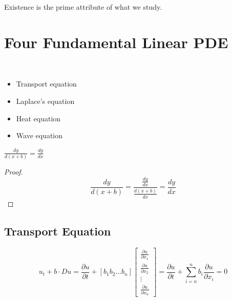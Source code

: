 \documentclass{article}
\begin{document}
\begin{remark}
    Existence is the prime attribute of what we study.
\end{remark}

\section{Four Fundamental Linear PDE}
\begin{definition}~
    \begin{itemize}
        \item Transport equation
        \item Laplace's equation
        \item Heat equation
        \item Wave equation
    \end{itemize}
\end{definition}

\begin{lemma}
    $\frac{dy}{d(x+b)} = \frac{dy}{dx}$
\end{lemma}

\begin{proof}
    \begin{equation*}
        \frac{dy}{d(x+b)} = \frac{\frac{dy}{dx}}{\frac{d(x+b)}{dx}} = \frac{dy}{dx}
    \end{equation*}
\end{proof}

\subsection{Transport Equation}
\begin{definition}
    \begin{equation}
        \label{equ:transport-equation}
        u_{t} + b \cdot Du =
        \frac{\partial u}{\partial t} +
        [b_{1} b_{2} \dots b_{n}]
        \begin{bmatrix}
            \frac{\partial u}{\partial x_{1}} \\
            \frac{\partial u}{\partial x_{2}} \\
            \vdots                            \\
            \frac{\partial u}{\partial x_{n}}
        \end{bmatrix}
        = \frac{\partial u}{\partial t} + \sum_{i=n}^{n}b_{i}\frac{\partial u}{\partial x_{i}} = 0
    \end{equation}
\end{definition}
\end{document}
